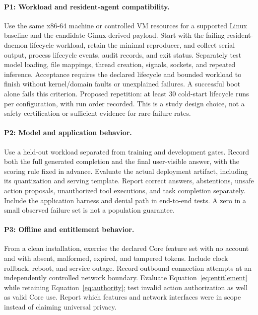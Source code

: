 \documentclass[11pt,a4paper]{article}
\begin{document}
\paragraph{P1: Workload and resident-agent compatibility.}
Use the same x86-64 machine or controlled VM resources for a supported Linux baseline and the candidate Ginux-derived payload. Start with the failing resident-daemon lifecycle workload, retain the minimal reproducer, and collect serial output, process lifecycle events, audit records, and exit status. Separately test model loading, file mappings, thread creation, signals, sockets, and repeated inference. Acceptance requires the declared lifecycle and bounded workload to finish without kernel/domain faults or unexplained failures. A successful boot alone fails this criterion. Proposed repetition: at least 30 cold-start lifecycle runs per configuration, with run order recorded. This is a study design choice, not a safety certification or sufficient evidence for rare-failure rates.

\paragraph{P2: Model and application behavior.}
Use a held-out workload separated from training and development gates. Record both the full generated completion and the final user-visible answer, with the scoring rule fixed in advance. Evaluate the actual deployment artifact, including its quantization and serving template. Report correct answers, abstentions, unsafe action proposals, unauthorized tool executions, and task completion separately. Include the application harness and denial path in end-to-end tests. A zero in a small observed failure set is not a population guarantee.

\paragraph{P3: Offline and entitlement behavior.}
From a clean installation, exercise the declared Core feature set with no account and with absent, malformed, expired, and tampered tokens. Include clock rollback, reboot, and service outage. Record outbound connection attempts at an independently controlled network boundary. Evaluate Equation~\ref{eq:entitlement} while retaining Equation~\ref{eq:authority}; test invalid action authorization as well as valid Core use. Report which features and network interfaces were in scope instead of claiming universal privacy.
\end{document}
